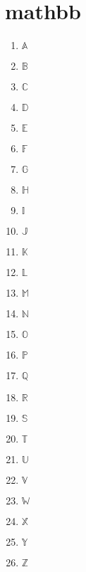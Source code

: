 \documentclass{scrartcl}
\begin{document}
\section{mathbb}
\begin{multicols}{3}
\begin{enumerate}[label=\Alph*:]
    \item $\mathbb{A}$
    \item $\mathbb{B}$
    \item $\mathbb{C}$
    \item $\mathbb{D}$
    \item $\mathbb{E}$
    \item $\mathbb{F}$
    \item $\mathbb{G}$
    \item $\mathbb{H}$
    \item $\mathbb{I}$
    \item $\mathbb{J}$
    \item $\mathbb{K}$
    \item $\mathbb{L}$
    \item $\mathbb{M}$
    \item $\mathbb{N}$
    \item $\mathbb{O}$
    \item $\mathbb{P}$
    \item $\mathbb{Q}$
    \item $\mathbb{R}$
    \item $\mathbb{S}$
    \item $\mathbb{T}$
    \item $\mathbb{U}$
    \item $\mathbb{V}$
    \item $\mathbb{W}$
    \item $\mathbb{X}$
    \item $\mathbb{Y}$
    \item $\mathbb{Z}$
\end{enumerate}
\end{multicols}
\end{document}
